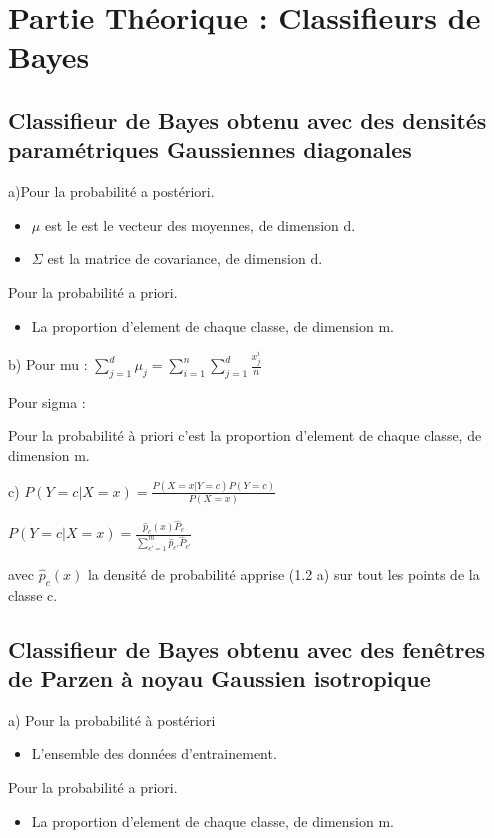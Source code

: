 \documentclass[a4paper,10pt]{article}
\begin{document}
\section{Partie Théorique : Classifieurs de Bayes}

\subsection{Classifieur de Bayes obtenu avec des densités paramétriques Gaussiennes diagonales}

a)Pour la probabilité a postériori.
\begin{itemize}
	\item $\mu$ est le est le vecteur des moyennes, de dimension d.
	\item $\Sigma$ est la matrice de covariance, de dimension d.
\end{itemize}
Pour la probabilité a priori.
\begin{itemize}
	\item La proportion d'element de chaque classe, de dimension m.
\end{itemize}

b)
Pour mu :
$\sum_{j=1}^{d} \mu_{j} = \sum_{i=1}^{n}\sum_{j=1}^{d} \frac{x_{j}^{i}}{n}$

Pour sigma :

Pour la probabilité à priori c'est la proportion d'element de chaque classe, de dimension m.

c)
$P(Y=c | X=x)  = \frac{P(X=x | Y=c) P(Y=c)}{P(X=x)} $

$P(Y=c | X=x)  = \frac{ \hat{p}_{c}(x) \hat{P}_{c}}{ \sum_{c'=1}^{m} \hat{p}_{c'} \hat{P}_{c'} } $

avec $ \hat{p}_{c}(x) $ la densité de probabilité apprise (1.2 a) sur tout les points de la classe c.

\subsection{Classifieur de Bayes obtenu avec des fenêtres de Parzen à noyau Gaussien isotropique}

a) Pour la probabilité à postériori
\begin{itemize}
	\item L'ensemble des données d'entrainement.
\end{itemize}

Pour la probabilité a priori.
\begin{itemize}
	\item La proportion d'element de chaque classe, de dimension m.
\end{itemize}
\end{document}
